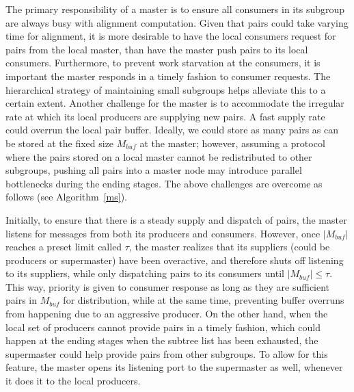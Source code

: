 \documentclass[10pt,journal,letterpaper,compsoc]{IEEEtran}
\begin{document}
The primary responsibility of a master is to ensure all consumers in its subgroup are always busy with alignment computation. Given that pairs could take varying time for alignment, it is more desirable to have the local consumers request for pairs from the local master, than have the master push pairs to its local consumers. Furthermore, to prevent work starvation at the consumers, it is important the master responds in a timely fashion to consumer requests. The hierarchical strategy of maintaining small subgroups helps alleviate this to a certain extent. Another challenge for the master is to accommodate the irregular rate at which its local producers are supplying new pairs. A fast supply rate could overrun the local pair buffer. Ideally, we could store as many pairs as can be stored at the fixed size $M_{buf}$ at the master; however, assuming a protocol where the pairs stored on a local master cannot be redistributed to other subgroups, pushing all pairs into a master node may introduce parallel bottlenecks during the ending stages. The above challenges are overcome as follows (see Algorithm~\ref{ms}). 

Initially, to ensure that there is a steady supply and dispatch of pairs, the master listens for messages from both its producers and consumers. However, once $|M_{buf}|$ reaches a preset limit called $\tau$, the master realizes that its suppliers (could be producers or supermaster) have been overactive, and therefore shuts off listening to its suppliers, while only dispatching pairs to its consumers until $|M_{buf}|\leq\tau$. This way, priority is given to consumer response as long as they are sufficient pairs in $M_{buf}$ for distribution, while at the same time, preventing buffer overruns from happening due to an aggressive producer. 
On the other hand, when the local set of producers cannot provide pairs in a timely fashion, which could happen at the ending stages when the subtree list has been exhausted, the supermaster could help provide pairs from other subgroups. To allow for this feature, the master opens its listening port to the supermaster as well, whenever it does it to the local producers.
\end{document}
